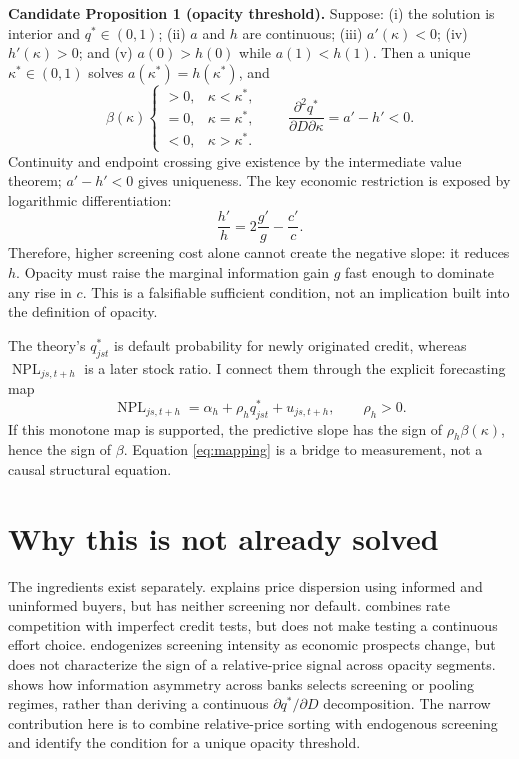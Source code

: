 \documentclass[11pt]{article}
\begin{document}
\textbf{Candidate Proposition 1 (opacity threshold).} Suppose: (i) the
solution is interior and \(q^*\in(0,1)\); (ii) \(a\) and \(h\) are continuous;
(iii) \(a'(\kappa)<0\); (iv) \(h'(\kappa)>0\); and (v)
\(a(0)>h(0)\) while \(a(1)<h(1)\). Then a unique
\(\kappa^*\in(0,1)\) solves \(a(\kappa^*)=h(\kappa^*)\), and
\begin{equation}
\beta(\kappa)
\begin{cases}
>0,&\kappa<\kappa^*,\\
=0,&\kappa=\kappa^*,\\
<0,&\kappa>\kappa^*.
\end{cases}
\qquad
\frac{\partial^2q^*}{\partial D\partial\kappa}=a'-h'<0.
\label{eq:threshold}
\end{equation}
Continuity and endpoint crossing give existence by the intermediate value
theorem; \(a'-h'<0\) gives uniqueness. The key economic restriction is exposed
by logarithmic differentiation:
\begin{equation}
\frac{h'}h=2\frac{g'}g-\frac{c'}c.
\label{eq:keycondition}
\end{equation}
Therefore, higher screening cost alone cannot create the negative slope: it
reduces \(h\). Opacity must raise the marginal information gain \(g\) fast
enough to dominate any rise in \(c\). This is a falsifiable sufficient
condition, not an implication built into the definition of opacity.

The theory's \(q^*_{jst}\) is default probability for newly originated credit,
whereas \(\operatorname{NPL}_{js,t+h}\) is a later stock ratio. I connect them
through the explicit forecasting map
\begin{equation}
\operatorname{NPL}_{js,t+h}=\alpha_h+\rho_hq^*_{jst}+u_{js,t+h},
\qquad \rho_h>0.
\label{eq:mapping}
\end{equation}
If this monotone map is supported, the predictive slope has the sign of
\(\rho_h\beta(\kappa)\), hence the sign of \(\beta\). Equation
\eqref{eq:mapping} is a bridge to measurement, not a causal structural
equation.

\section{Why this is not already solved}

The ingredients exist separately. \citet{varian1980} explains price dispersion
using informed and uninformed buyers, but has neither screening nor default.
\citet{broecker1990} combines rate competition with imperfect credit tests, but
does not make testing a continuous effort choice. \citet{ruckes2004}
endogenizes screening intensity as economic prospects change, but does not
characterize the sign of a relative-price signal across opacity segments.
\citet{dellariccia2006} shows how information asymmetry across banks selects
screening or pooling regimes, rather than deriving a continuous
\(\partial q^*/\partial D\) decomposition. The narrow contribution here is to
combine relative-price sorting with endogenous screening and identify the
condition for a unique opacity threshold.
\end{document}
